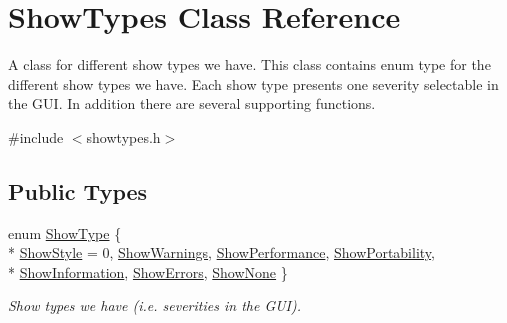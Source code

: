 \hypertarget{class_show_types}{\section{Show\-Types Class Reference}
\label{class_show_types}
}


A class for different show types we have. This class contains enum type for the different show types we have. Each show type presents one severity selectable in the G\-U\-I. In addition there are several supporting functions.  




{\ttfamily \#include $<$showtypes.\-h$>$}

\subsection*{Public Types}
\begin{DoxyCompactItemize}
\item 
enum \hyperlink{class_show_types_a92c368f2a33741268265ac2d931eae3f}{Show\-Type} \{ \\*
\hyperlink{class_show_types_a92c368f2a33741268265ac2d931eae3fad7fa690ee98fab103ce8b4fea380ea03}{Show\-Style} = 0, 
\hyperlink{class_show_types_a92c368f2a33741268265ac2d931eae3fad27ca846664eaae981e662f825fdafb7}{Show\-Warnings}, 
\hyperlink{class_show_types_a92c368f2a33741268265ac2d931eae3fa429281b2318ac36f7071c14536c60dba}{Show\-Performance}, 
\hyperlink{class_show_types_a92c368f2a33741268265ac2d931eae3fa557739620d1c99e23f38e2911a33858c}{Show\-Portability}, 
\\*
\hyperlink{class_show_types_a92c368f2a33741268265ac2d931eae3fa49cdfa7cba033bcb3fa091c3fbc63197}{Show\-Information}, 
\hyperlink{class_show_types_a92c368f2a33741268265ac2d931eae3fabc0c6d7d1314b7d92188a1d66fc4f1ca}{Show\-Errors}, 
\hyperlink{class_show_types_a92c368f2a33741268265ac2d931eae3fade7d9bfa7206900801f2cf24376451a2}{Show\-None}
 \}
\begin{DoxyCompactList}\small\item\em Show types we have (i.\-e. severities in the G\-U\-I). \end{DoxyCompactList}\end{DoxyCompactItemize}
